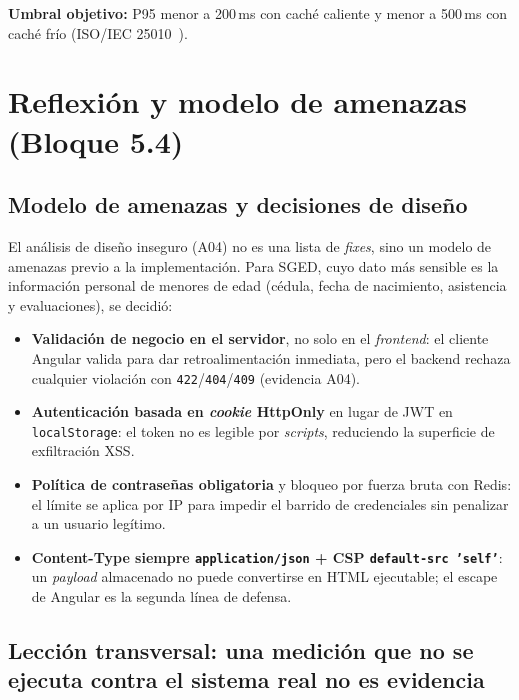 \documentclass[11pt,a4paper]{article}
\begin{document}
\textbf{Umbral objetivo:} P95 menor a 200\,ms con caché caliente y menor a
500\,ms con caché frío (ISO/IEC 25010~\cite{iso25010}).


\section{Reflexión y modelo de amenazas (Bloque 5.4)}
\label{sec:reflexion}

\subsection{Modelo de amenazas y decisiones de diseño}

El análisis de diseño inseguro (A04) no es una lista de \emph{fixes}, sino un
modelo de amenazas previo a la implementación. Para SGED, cuyo dato más
sensible es la información personal de menores de edad (cédula, fecha de
nacimiento, asistencia y evaluaciones), se decidió:

\begin{itemize}[leftmargin=*]
  \item \textbf{Validación de negocio en el servidor}, no solo en el
    \emph{frontend}: el cliente Angular valida para dar retroalimentación
    inmediata, pero el backend rechaza cualquier violación con
    \texttt{422}/\texttt{404}/\texttt{409} (evidencia A04).
  \item \textbf{Autenticación basada en \emph{cookie} HttpOnly} en lugar de
    JWT en \texttt{localStorage}: el token no es legible por \emph{scripts},
    reduciendo la superficie de exfiltración XSS.
  \item \textbf{Política de contraseñas obligatoria} y bloqueo por fuerza
    bruta con Redis: el límite se aplica por IP para impedir el barrido de
    credenciales sin penalizar a un usuario legítimo.
  \item \textbf{Content-Type siempre \texttt{application/json} + CSP
    \texttt{default-src 'self'}}: un \emph{payload} almacenado no puede
    convertirse en HTML ejecutable; el escape de Angular es la segunda línea
    de defensa.
\end{itemize}

\subsection{Lección transversal: una medición que no se ejecuta contra el
sistema real no es evidencia}
\end{document}
